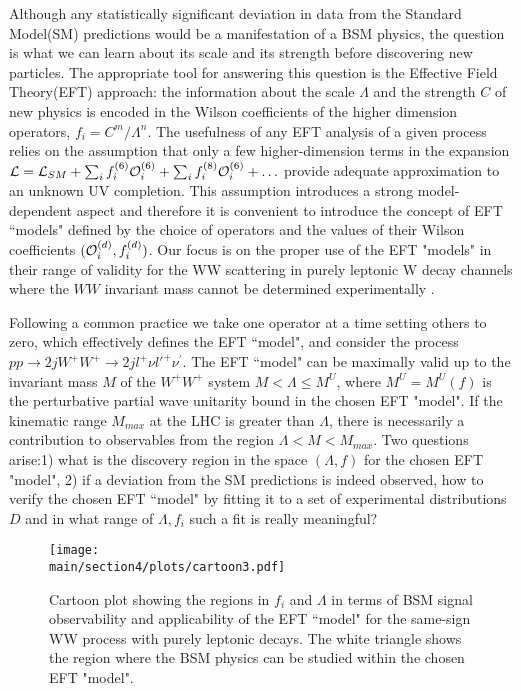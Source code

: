
Although any statistically significant deviation in data from the  Standard Model(SM) predictions would be a manifestation of a BSM physics, the question is what we can learn about its scale and its strength before discovering new particles. The appropriate tool for answering this question is the Effective Field Theory(EFT) approach: the information about the  scale $\Lambda$ and the strength $C$ of new physics is encoded in  the Wilson coefficients of the higher dimension operators, $f_i=C^m/\Lambda^n$.
The usefulness of any EFT analysis of a given process relies on the assumption that only a few higher-dimension terms 
in the expansion ${\cal L}={\cal L}_{SM}+\sum_i f_i^{(6)}{\cal O}_i^{(6)}+ \sum_i f_i^{(8)}{\cal O}_i^{(6)}+\ldots$ 
provide adequate approximation to an unknown UV completion.   
This assumption  introduces a strong model-dependent aspect and therefore it is convenient to introduce the concept of EFT ``models" defined by the choice of operators  and the values of their Wilson coefficients $({\cal O}_i^{(d)},f_i^{(d)})$.  Our focus is on the proper use of the EFT "models" in their range of validity for the WW scattering in purely leptonic W decay channels where the $WW$ invariant mass cannot be determined experimentally  \cite{Kalinowski:2018oxd}.



Following a common practice we take one operator at a time setting others to 
zero,  which effectively defines the EFT ``model", 
and consider   the process 
$pp\rightarrow 2jW^+ W^+ \rightarrow 2j l^+\nu l'^+\nu^\prime$. 
The EFT ``model" can be maximally valid up to the invariant mass $M$ of the 
$W^+W^+$ system 
$M<\Lambda\leq M^U$, where $M^U=M^U(f)$ is the perturbative partial wave unitarity bound  in the chosen EFT "model".  
If  the kinematic range $M_{max}$  at the LHC is greater than $\Lambda$, there is necessarily a 
contribution to observables from the region $\Lambda < M < M_{max}$.  
Two questions arise:1) what is the discovery region in the space $(\Lambda, f)$ for the chosen EFT "model", 2) if a deviation from  the SM predictions is indeed observed,
how to verify the chosen EFT  ``model"  by fitting it to a set of experimental distributions $D$ 
and in what range of $\Lambda, f_i$ such a fit is really meaningful?
%
%
\begin{figure}
\texttt{[image: \\main/section4/plots/cartoon3.pdf]}
\caption{
Cartoon plot showing the regions in $f_i$ and $\Lambda$ in terms of BSM signal observability
and applicability of the EFT ``model"  for  the same-sign WW process with purely 
leptonic decays.  The white triangle shows the region
where the BSM physics can be studied within the chosen EFT "model".}
\label{fig:cartoonplot}
\end{figure}
%

